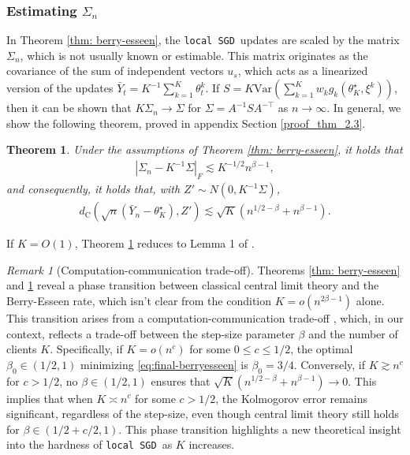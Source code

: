 \documentclass[a4paper,11pt]{article}
\numberwithin{equation}{section}
\theoremstyle{plain}
\newtheorem{theorem}{Theorem}[section]
\theoremstyle{remark}
\newtheorem{remark}{Remark}[section]
\newcommand{\DFL}{\texttt{local SGD}}
\newcommand{\minparam}{\theta^\star_K}
\newcommand{\var}{\mathrm{Var}}
\begin{document}
\subsubsection{Estimating \texorpdfstring{$\Sigma_n$}{Sigma\_n}} \label{se:sigma}
In Theorem \ref{thm: berry-esseen}, the \DFL\ updates are scaled by the matrix $\Sigma_n$, which is not usually known or estimable. This matrix originates as the covariance of the sum of independent vectors $u_s$, which acts as a linearized version of the updates $\bar{Y}_t=K^{-1}\sum_{k=1}^K \theta_t^k$. If  $S= K \var(\sum_{k=1}^K w_k g_k(\minparam, \xi^k))$, then it can be shown that $K\Sigma_n \to \Sigma$ for $\Sigma= A^{-1} S A^{-\top}$ as $n\to \infty$. In general, we show the following theorem, proved in appendix Section \ref{proof_thm_2.3}.
\begin{theorem} \label{prop:cov-est}
    Under the assumptions of Theorem \ref{thm: berry-esseen}, it holds that 
    \begin{align}\label{eq:cov-estimation}
        |\Sigma_n - K^{-1}\Sigma|_F \lesssim K^{-1/2}n^{\beta - 1},
    \end{align}
    and consequently, it holds that, with $Z' \sim N(0, K^{-1}\Sigma)$,
    \begin{align}\label{eq:final-berryesseen}
        d_{\mathrm{C}}(\sqrt{n}(\bar{Y}_n - \minparam), Z')\lesssim \sqrt{K}( n^{1/2 - \beta}+ n^{\beta-1}).
    \end{align}
\end{theorem}
If $K =O(1)$, Theorem \ref{prop:cov-est} reduces to Lemma 1 of \cite{sheshukova2025gaussian}. 
\begin{remark}[Computation-communication trade-off]\label{rem:phase-transition}
  Theorems \ref{thm: berry-esseen} and \ref{prop:cov-est} reveal a phase transition between classical central limit theory and the Berry-Esseen rate, which isn't clear from the condition $K=o(n^{2\beta-1})$ alone. This transition arises from a computation-communication trade-off \cite{tsiatsis2005computation, le2013differentially, dieuleveut2019communication, ballotta2020computation}, which, in our context, reflects a trade-off between the step-size parameter $\beta$ and the number of clients $K$. Specifically, if $K=o(n^c)$ for some $0 \leq c \leq 1/2$, the optimal $\beta_0 \in (1/2, 1)$ minimizing \eqref{eq:final-berryesseen} is $\beta_0=3/4$. Conversely, if $K \gtrsim n^c$ for $c>1/2$, no $\beta \in (1/2, 1)$ ensures that $\sqrt{K}( n^{1/2 - \beta}+ n^{\beta-1})\to 0$. This implies that when $K \asymp n^c$ for some $c>1/2$, the Kolmogorov error remains significant, regardless of the step-size, even though central limit theory still holds for $\beta \in (1/2+c/2, 1)$. This phase transition highlights a new theoretical insight into the hardness of \DFL\ as $K$ increases.
\end{remark}
\end{document}
